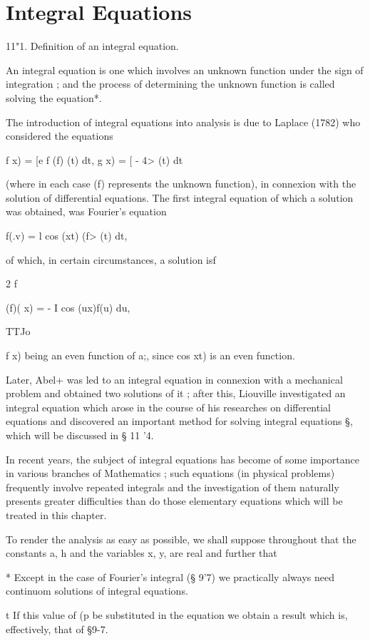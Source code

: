 \chapter{Integral Equations} 

11"1. Definition of an integral equation.

An integral equation is one which involves an unknown function under
the sign of integration ; and the process of determining the unknown
function is called solving the equation*.

The introduction of integral equations into analysis is due to Laplace
(1782) who considered the equations

f x) = [e f (f) (t) dt, g x) = [ - 4> (t) dt

(where in each case (f) represents the unknown function), in connexion
with the solution of differential equations. The first integral
equation of which a solution was obtained, was Fourier's equation

f(.v) = l cos (xt) (f> (t) dt,

of which, in certain circumstances, a solution isf

2 f

(f)( x) = - I cos (ux)f(u) du,

TTJo

f x) being an even function of a;, since cos xt) is an even function.

Later, Abel+ was led to an integral equation in connexion with a
mechanical problem and obtained two solutions of it ; after this,
Liouville investigated an integral equation which arose in the course
of his researches on differential equations and discovered an
important method for solving integral equations §, which will be
discussed in § 11 '4.

In recent years, the subject of integral equations has become of some
importance in various branches of Mathematics ; such equations (in
physical problems) frequently involve repeated integrals and the
investigation of them naturally presents greater difficulties than do
those elementary equations which will be treated in this chapter.

To render the analysis as easy as possible, we shall suppose
throughout that the constants a, h and the variables x, y, are real
and further that

* Except in the case of Fourier's integral (§ 9'7) we practically
always need continuom solutions of integral equations.

t If this value of (p be substituted in the equation we obtain a
result which is, effectively, that of §9-7.


